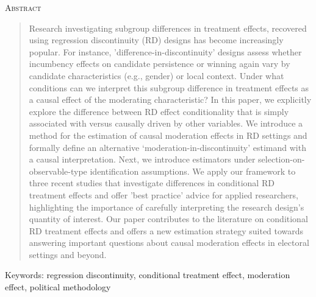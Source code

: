 \documentclass[12pt]{article}
\makeatletter
\renewcommand{\section}{\@startsection{section}{1}{0mm}{-\baselineskip}{0.7\baselineskip}{\centering\normalfont\normalsize\bf}}
\renewenvironment{abstract}
 {\begin{center}\normalsize\textsc{Abstract}%
 \end{center}\begin{quote}\normalsize}
 {\end{quote}}
\makeatother
\begin{document}
\begin{abstract}

\noindent 
Research investigating subgroup differences in treatment effects, recovered using regression discontinuity (RD) designs has become increasingly popular. For instance, 'difference-in-discontinuity' designs assess whether incumbency effects on candidate persistence or winning again vary by candidate characteristics (e.g., gender) or local context. Under what conditions can we interpret this subgroup difference in treatment effects as a causal effect of the moderating characteristic? In this paper, we explicitly explore the difference between RD effect conditionality that is simply associated with versus causally driven by other variables. We introduce a method for the estimation of causal moderation effects in RD settings and  formally define an alternative `moderation-in-discontinuity' estimand with a causal interpretation. Next, we introduce estimators under selection-on-observable-type identification assumptions. We apply our framework to three recent studies that investigate differences in conditional RD treatment effects and offer 'best practice' advice for applied researchers, highlighting the importance of carefully interpreting the research design's quantity of interest.  Our paper contributes to the literature on conditional RD treatment effects and offers a new estimation strategy suited towards answering important questions about causal moderation effects in electoral settings and beyond.

\end{abstract}
\vspace*{0.5cm}
Keywords: regression discontinuity, conditional treatment effect, moderation effect, political methodology
%    
%  






\newpage
\setcounter{page}{1} \addtolength{\baselineskip}{0.3\baselineskip}

\section{INTRODUCTION}
\end{document}
